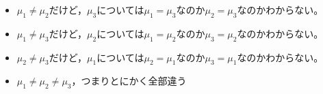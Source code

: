 \begin{itemize}
	\item $\mu_1 \neq \mu_2$だけど，$\mu_3$については$\mu_1=\mu_3$なのか$\mu_2=\mu_3$なのかわからない。
	\item $\mu_1 \neq \mu_3$だけど，$\mu_2$については$\mu_1=\mu_2$なのか$\mu_3=\mu_2$なのかわからない。
	\item $\mu_2 \neq \mu_3$だけど，$\mu_1$については$\mu_2=\mu_1$なのか$\mu_3=\mu_1$なのかわからない。
	\item $\mu_1 \neq \mu_2 \neq \mu_3$，つまりとにかく全部違う
\end{itemize}
